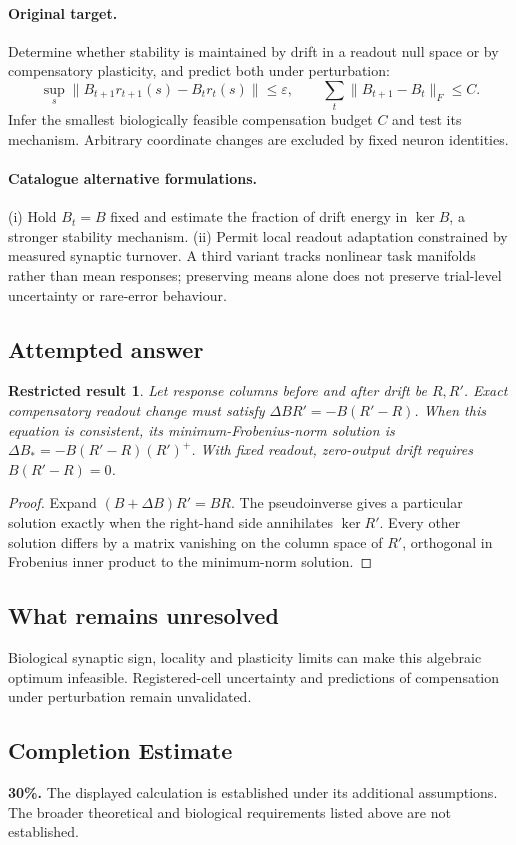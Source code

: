 \documentclass[11pt]{article}
\newtheorem{attemptresult}{Restricted result}[section]
\begin{document}
\paragraph{Original target.}
Determine whether stability is maintained by drift in a readout null space or by compensatory plasticity, and predict both under perturbation:
\[
\sup_s\|B_{t+1}r_{t+1}(s)-B_tr_t(s)\|\leq\varepsilon,
\qquad
\sum_t\|B_{t+1}-B_t\|_F\leq C.
\]
Infer the smallest biologically feasible compensation budget $C$ and test its mechanism. Arbitrary coordinate changes are excluded by fixed neuron identities.
\paragraph{Catalogue alternative formulations.}
(i) Hold $B_t=B$ fixed and estimate the fraction of drift energy in $\ker B$, a stronger stability mechanism. (ii) Permit local readout adaptation constrained by measured synaptic turnover. A third variant tracks nonlinear task manifolds rather than mean responses; preserving means alone does not preserve trial-level uncertainty or rare-error behaviour.
\subsection{Attempted answer}
\begin{attemptresult}
Let response columns before and after drift be $R,R\prime$. Exact compensatory readout change must satisfy $\Delta B R\prime=-B(R\prime-R)$. When this equation is consistent, its minimum-Frobenius-norm solution is $\Delta B_*=-B(R\prime-R)(R\prime)^+$. With fixed readout, zero-output drift requires $B(R\prime-R)=0$.
\end{attemptresult}
\begin{proof}
Expand $(B+\Delta B)R\prime=BR$. The pseudoinverse gives a particular solution exactly when the right-hand side annihilates $\ker R\prime$. Every other solution differs by a matrix vanishing on the column space of $R\prime$, orthogonal in Frobenius inner product to the minimum-norm solution.
\end{proof}
\subsection{What remains unresolved}
Biological synaptic sign, locality and plasticity limits can make this algebraic optimum infeasible. Registered-cell uncertainty and predictions of compensation under perturbation remain unvalidated.
\subsection{Completion Estimate}
\textbf{30\%.} The displayed calculation is established under its additional assumptions. The broader theoretical and biological requirements listed above are not established.
\end{document}
